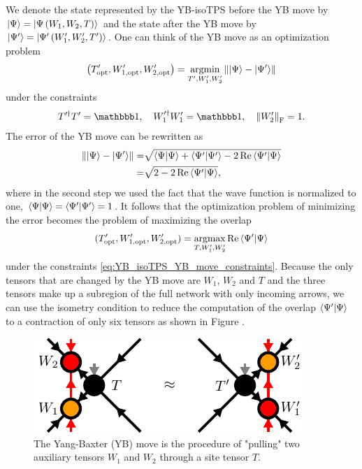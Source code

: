 We denote the state represented by the YB-isoTPS before the YB move by $\ket{\Psi} = \ket{\Psi\left(W_1, W_2, T\right)}$ and the state after the YB move by $\ket{\Psi^\prime} = \ket{\Psi^\prime\left(W_1^\prime, W_2^\prime, T^\prime\right)}$. One can think of the YB move as an optimization problem
\begin{equation}
	\label{eq:YB_isoTPS_YB_move_standard}
	\left(T^\prime_\text{opt},W_{1,\text{opt}}^\prime,W_{2,\text{opt}}^\prime\right) = \underset{T^\prime,W_1^\prime,W_2^\prime}{\operatorname{argmin}}\left\lVert \ket{\Psi} - \ket{\Psi^\prime}\right\rVert
\end{equation}
under the constraints
\begin{equation}
	\label{eq:YB_isoTPS_YB_move_constraints}
	T^{\prime\dagger}T^\prime = \id, \quad W_1^{\prime\dagger}W_1^\prime = \id, \quad \left\lVert W_2^\prime \right\rVert_\text{F} = 1.
\end{equation}
The error of the YB move can be rewritten as
\begin{equation}
	\label{eq:YB_isoTPS_YB_move_rewritten_error}
	\begin{split}
		\left\lVert \ket{\Psi} - \ket{\Psi^\prime} \right\rVert =& \sqrt{\braket{\Psi|\Psi} + \braket{\Psi^\prime|\Psi^\prime} - 2\operatorname{Re}\braket{\Psi^\prime|\Psi}} \\
		=& \sqrt{2 - 2\operatorname{Re}\braket{\Psi^\prime|\Psi}},
	\end{split}
\end{equation}
where in the second step we used the fact that the wave function is normalized to one, $\braket{\Psi|\Psi} = \braket{\Psi^\prime|\Psi^\prime} = 1$. It follows that the optimization problem of minimizing the error becomes the problem of maximizing the overlap
\begin{equation}
	\label{eq:YB_isoTPS_YB_move_alternative_formulation}
	(T_\text{opt}^\prime, W_{1,\text{opt}}^\prime, W_{2,\text{opt}}^\prime) = \underset{T,W_1^\prime,W_2^\prime}{\operatorname{argmax}}\operatorname{Re}\braket{\Psi^\prime|\Psi}
\end{equation}
under the constraints \eqref{eq:YB_isoTPS_YB_move_constraints}. Because the only tensors that are changed by the YB move are $W_1$, $W_2$ and $T$ and the three tensors make up a subregion of the full network with only incoming arrows, we can use the isometry condition to reduce the computation of the overlap $\braket{\Psi^\prime|\Psi}$ to a contraction of only six tensors as shown in Figure .\par
\begin{figure}
	\centering
	\includegraphics[scale=1]{figures/tikz/YB_isoTPS/yang_baxter_move/yang_baxter_move.pdf}
	\caption{The Yang-Baxter (YB) move is the procedure of "pulling" two auxiliary tensors $W_1$ and $W_2$ through a site tensor $T$.}
	\label{fig:YB_isoTPS_YB_move_closeup}
\end{figure}
